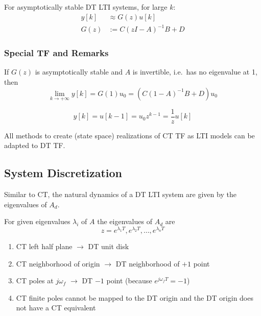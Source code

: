
For asymptotically stable DT LTI systems, for large $k$:
\begin{align*}
    y[k] & \approx G(z)u[k]    \\
    G(z) & :=C{(zI-A)}^{-1}B+D
\end{align*}
\subsubsection{Special TF and Remarks}

If $G(z)$ is asymptotically stable and $A$ is invertible, i.e.\ has no eigenvalue at 1, then
\begin{equation*}
    \lim_{k\to+\infty}y[k]=G(1)u_0=(C{(1-A)}^{-1}B+D)u_0
\end{equation*}


\begin{equation*}
    y[k] =u[k-1] =u_0z^{k-1}=\frac1zu[k]
\end{equation*}


All methods to create (state space) realizations of CT TF as LTI models can be adapted to DT TF.\

\subsection{System Discretization}

Similar to CT, the natural dynamics of a DT LTI system are given by the eigenvalues of $A_d$.

For given eigenvalues $\lambda_i$ of $A$ the eigenvalues of $A_d$ are
\begin{equation*}
    z=e^{\lambda_1T},e^{\lambda_2T},\ldots,e^{\lambda_{n}T}
\end{equation*}


\begin{enumerate}
    \item CT left half plane $\rightarrow$ DT unit disk
    \item CT neighborhood of origin $\rightarrow$ DT neighborhood of $+1$ point
    \item CT poles at $j\omega_f$ $\rightarrow$ DT $-1$ point (because $e^{j\omega_{f}T}=-1$)
    \item CT finite poles cannot be mapped to the DT origin and the DT origin does not have a CT equivalent
\end{enumerate}

